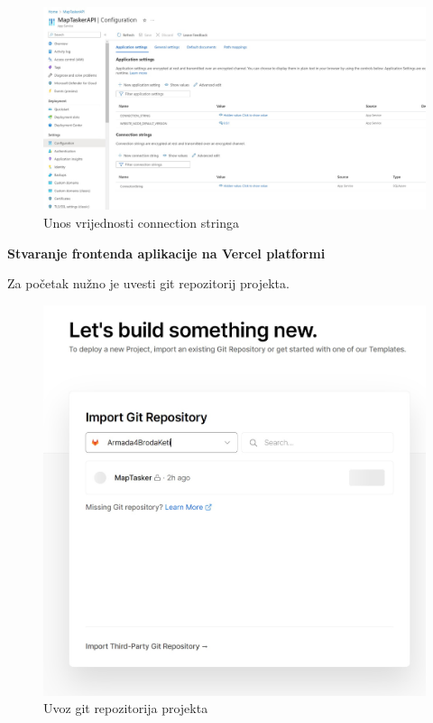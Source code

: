 			\begin{figure}[H]
				 \includegraphics[width=\linewidth]{./slike/backend2.jpg}
				  \centering
				  \caption{Unos vrijednosti connection stringa}
			  \end{figure}
			
			\vspace{30mm}
	
			\noindent\textbf{Stvaranje frontenda aplikacije na Vercel platformi}
	
			\noindent Za početak nužno je uvesti git repozitorij projekta.
	
			\vspace{10mm}
	
			\begin{figure}[H]
				 \includegraphics[width=\linewidth]{./slike/front1.jpg}
				  \centering
				  \caption{Uvoz git repozitorija projekta}
			  \end{figure}
	
